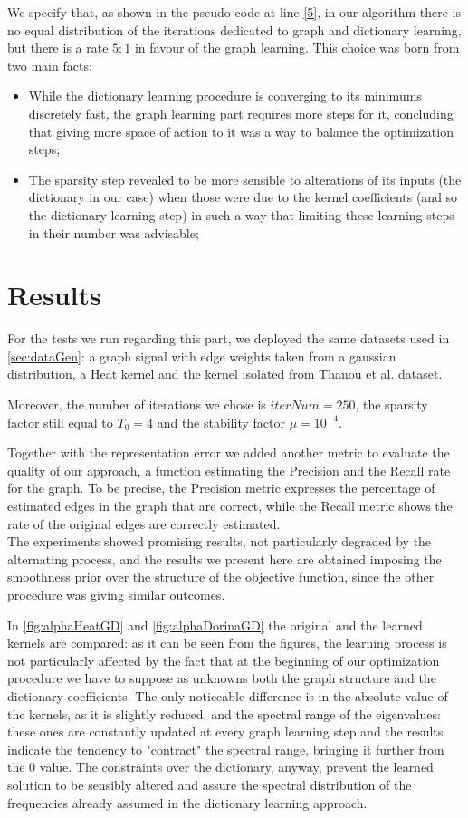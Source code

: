 We specify that, as shown in the pseudo code at line \ref{5}, in our algorithm there is no equal distribution of the iterations dedicated to graph and dictionary learning, but there is a rate $5:1$ in favour of the graph learning. This choice was born from two main facts:
\begin{itemize}
\item While the dictionary learning procedure is converging to its minimums discretely fast, the graph learning part requires more steps for it, concluding that giving more space of action to it was a way to balance the optimization steps;
\item The sparsity step revealed to be more sensible to alterations of its inputs (the dictionary in our case) when those were due to the kernel coefficients (and so the dictionary learning step) in such a way that limiting these learning steps in their number was advisable;
\end{itemize}

\section{Results}
For the tests we run regarding this part, we deployed the same datasets used in \autoref{sec:dataGen}: a graph signal with edge weights taken from a gaussian distribution, a Heat kernel and the kernel isolated from Thanou et al. dataset.

Moreover, the number of iterations we chose is $iterNum = 250$, the sparsity factor still equal to $T_0 = 4$ and the stability factor $\mu = 10^{-4}$.

Together with the representation error we added another metric to evaluate the quality of our approach, a function estimating the Precision and the Recall rate for the graph. To be precise, the Precision metric expresses the percentage of estimated edges in the graph that are correct, while the Recall metric shows the rate of the original edges are correctly estimated.\\
The experiments showed promising results, not particularly degraded by the alternating process, and the results we present here are obtained imposing the smoothness prior over the structure of the objective function, since the other procedure was giving similar outcomes.

In \autoref{fig:alphaHeatGD} and \autoref{fig:alphaDorinaGD} the original and the learned kernels are compared: as it can be seen from the figures, the learning process is not particularly affected  by the fact that at the beginning of our optimization procedure we have to suppose as unknowns both the graph structure and the dictionary coefficients. The only noticeable difference is in the absolute value of the kernels, as it is slightly reduced, and the spectral range of the eigenvalues: these ones are constantly updated at every graph learning step and the results indicate the tendency to "contract" the spectral range, bringing it further from the 0 value. The constraints over the dictionary, anyway, prevent the learned solution to be sensibly altered and assure the spectral distribution of the frequencies already assumed in the dictionary learning approach.

